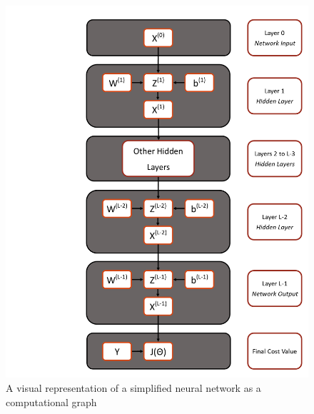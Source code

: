 \documentclass[12pt,letterpaper]{article}
\begin{document}
\begin{figure}[H]
\begin{center}
\includegraphics[scale=0.8]{../Figures/LayerGraph}
\end{center}
\caption{A visual representation of a simplified neural network as a computational graph}
\label{fig-ComputationalGraph}
\end{figure}
\end{document}
